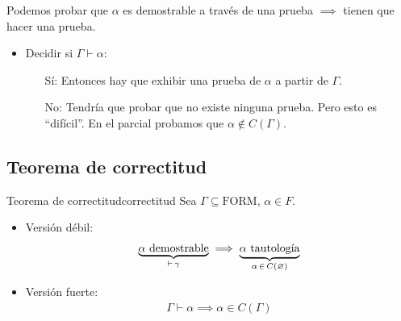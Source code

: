 Podemos probar que $\alpha$ es demostrable a través de una prueba
$\implies$ tienen que hacer una prueba.

\begin{itemize}
    \item Decidir si $\Gamma \vdash \alpha$:
        \begin{itemize}
            \item[Sí:] Entonces hay que exhibir una prueba de $\alpha$ a 
                partir de $\Gamma$.
            \item[No:] Tendría que probar que no existe ninguna prueba. Pero
                esto es ``difícil''. En el parcial probamos que 
                $\alpha \notin C(\Gamma)$.
            
        \end{itemize}
\end{itemize}

\subsection{Teorema de correctitud}

\begin{teorema}{Teorema de correctitud}{correctitud}
    Sea $\Gamma \subseteq \mathrm{FORM}$, $\alpha \in F$.

    \medskip

    \begin{itemize}
        \item Versión débil:
            \begin{gather*}
                \underbrace{\alpha \text{ demostrable}}_{\vdash \, \gamma} 
                \implies 
                \underbrace{\alpha \text{ tautología}}_{%
                \alpha \, \in \, C(\varnothing)}
            \end{gather*}
        \item Versión fuerte:
            \begin{gather*}
                \Gamma \vdash \alpha \implies \alpha \in C(\Gamma)
            \end{gather*}
    \end{itemize}
\end{teorema}


